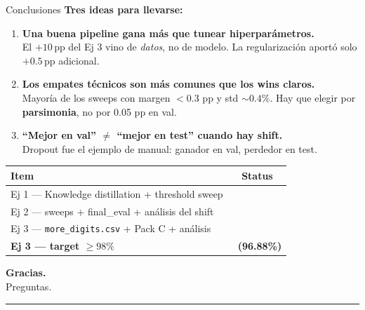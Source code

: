 \documentclass[11pt,aspectratio=169]{beamer}
\newcommand{\code}[1]{\texttt{\textcolor{accent}{#1}}}
\newcommand{\ok}{\textcolor{good}{\ding{52}}}
\newcommand{\nok}{\textcolor{warn}{\ding{56}}}
\begin{document}
\begin{frame}{Conclusiones}
\textbf{Tres ideas para llevarse:}\\[0.4em]

\begin{enumerate}\setlength\itemsep{0.3em}
  \item \textbf{Una buena pipeline gana más que tunear hiperparámetros.}\\
        El \(+10\)\,pp del Ej 3 vino de \emph{datos}, no de modelo. La regularización aportó solo \(+0.5\)\,pp adicional.
  \item \textbf{Los empates técnicos son más comunes que los wins claros.}\\
        Mayoría de los sweeps con margen $<0.3$ pp y std $\sim 0.4\%$. Hay que elegir por \textbf{parsimonia}, no por 0.05 pp en val.
  \item \textbf{``Mejor en val'' $\neq$ ``mejor en test'' cuando hay shift.}\\
        Dropout fue el ejemplo de manual: ganador en val, perdedor en test.
\end{enumerate}
\vspace{0.4em}

\centering\small
\begin{tabular}{@{}lc@{}}
\toprule
\textbf{Item} & \textbf{Status} \\
\midrule
Ej 1 — Knowledge distillation + threshold sweep              & \ok \\
Ej 2 — sweeps + final\_eval + análisis del shift             & \ok \\
Ej 3 — \code{more\_digits.csv} + Pack C + análisis             & \ok \\
\textbf{Ej 3 — target $\geq 98\%$}                          & \nok\ \textbf{(96.88\%)} \\
\bottomrule
\end{tabular}
\end{frame}

{
\begin{frame}[plain]
\centering
\vspace*{2cm}
\color{white}
{\fontsize{36}{42}\selectfont\bfseries Gracias.}\\[1.5em]
{\Large Preguntas.}\\[2.5em]

\textcolor{white!75}{\rule{6cm}{0.4pt}}
\end{frame}
}
\end{document}
